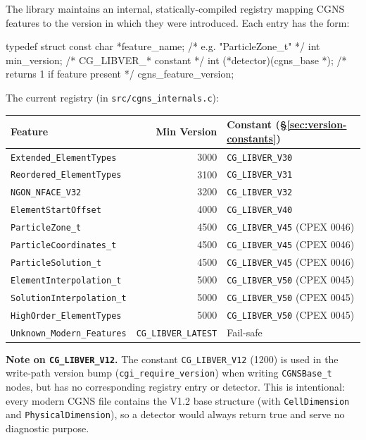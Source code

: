 \documentclass[11pt,letterpaper]{article}
\makeatletter
\let\cgns@orig@lstlisting\lstlisting
\let\cgns@endorig@lstlisting\endlstlisting
\renewenvironment{lstlisting}
  {\par\needspace{5\baselineskip}\nolinenumbers\cgns@orig@lstlisting}
  {\cgns@endorig@lstlisting\par\linenumbers}
\makeatother
\begin{document}
The library maintains an internal, statically-compiled registry
mapping CGNS features to the version in which they were introduced.
Each entry has the form:

\begin{lstlisting}[language=C]
typedef struct {
    const char *feature_name;     /* e.g. "ParticleZone_t" */
    int         min_version;      /* CG_LIBVER_* constant  */
    int (*detector)(cgns_base *); /* returns 1 if feature present */
} cgns_feature_version;
\end{lstlisting}

The current registry (in \texttt{src/cgns\_internals.c}):

\begin{center}
\begin{tabular}{l r l}
\toprule
\rowcolor{cgnsblue!15}
\textbf{Feature} & \textbf{Min Version} & \textbf{Constant (§\ref{sec:version-constants})} \\
\midrule
\texttt{Extended\_ElementTypes}       & 3000 & \texttt{CG\_LIBVER\_V30} \\
\texttt{Reordered\_ElementTypes}      & 3100 & \texttt{CG\_LIBVER\_V31} \\
\texttt{NGON\_NFACE\_V32}             & 3200 & \texttt{CG\_LIBVER\_V32} \\
\texttt{ElementStartOffset}           & 4000 & \texttt{CG\_LIBVER\_V40} \\
\texttt{ParticleZone\_t}              & 4500 & \texttt{CG\_LIBVER\_V45} (CPEX 0046) \\
\texttt{ParticleCoordinates\_t}       & 4500 & \texttt{CG\_LIBVER\_V45} (CPEX 0046) \\
\texttt{ParticleSolution\_t}          & 4500 & \texttt{CG\_LIBVER\_V45} (CPEX 0046) \\
\texttt{ElementInterpolation\_t}      & 5000 & \texttt{CG\_LIBVER\_V50} (CPEX 0045) \\
\texttt{SolutionInterpolation\_t}     & 5000 & \texttt{CG\_LIBVER\_V50} (CPEX 0045) \\
\texttt{HighOrder\_ElementTypes}      & 5000 & \texttt{CG\_LIBVER\_V50} (CPEX 0045) \\
\texttt{Unknown\_Modern\_Features} & \texttt{CG\_LIBVER\_LATEST} & Fail-safe \\
\bottomrule
\end{tabular}
\end{center}

\textbf{Note on \texttt{CG\_LIBVER\_V12}.}  The constant
\texttt{CG\_LIBVER\_V12} (1200) is used in the write-path version
bump (\texttt{cgi\_require\_version}) when writing
\texttt{CGNSBase\_t} nodes, but has no corresponding registry entry or
detector.  This is intentional: every modern CGNS file contains the
V1.2 base structure (with \texttt{CellDimension} and
\texttt{PhysicalDimension}), so a detector would always return true
and serve no diagnostic purpose.
\end{document}
